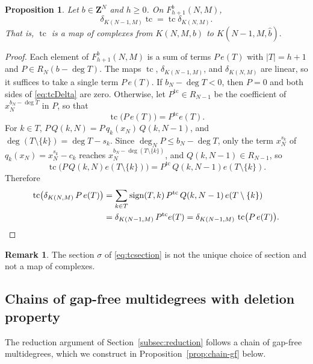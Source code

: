 \documentclass[12pt]{amsart}
\newtheorem{proposition}[theorem]{Proposition}
\theoremstyle{definition}
\newtheorem{remark1}[theorem]{Remark}
\theoremstyle{remark}
\newcommand{\sgn}{\operatorname{sign}}
\newcommand{\tc}{\operatorname{tc}}
\def\what{\hat}
\newcommand{\Z}{\mathbf Z}
\begin{document}
\begin{proposition}\label{prop:tcchain}
Let $b\in\Z^N$ and $h \geq 0$.
On $F^b_{h+1}(N, M)$,
\begin{equation}\label{eq:tcDelta}
 \delta_{K(N-1,M)} \tc = \tc \delta_{K(N, M)}.
 \end{equation}
That is, $\tc$ is a map of complexes from $K(N, M, b)$ to $K(N-1, M, {\what b}).$
\end{proposition}
\begin{proof}
Each element of $F^b_{h+1}(N, M)$ is a sum of terms $P\,e(T)$ with $|T|=h+1$
and $P\in R_N(b-\deg T)$.
The maps $\tc$, $\delta_{K(N-1, M)}$, and $\delta_{K(N, M)}$ are linear,
so it suffices to take a single term $P\,e(T)$. 
If $b_N-\deg T<0$, then $P=0$ and both sides of \eqref{eq:tcDelta}
are zero.
Otherwise, let $P^{\tc}\in R_{N-1}$ be the coefficient of
$x_N^{b_N-\deg T}$ in $P$, so that
\[ \tc\bigl(P\,e(T)\bigr)=P^{\tc}e(T). \]
For $k\in T$, $P\,Q(k,N)=P\,q_k(x_N)\,Q(k,N-1)$, and
$\deg(T\setminus\{k\})=\deg T-s_k$.
Since $\deg_N P\le b_N-\deg T$, only the term $x_N^{s_k}$ of
$q_k(x_N) = x_N^{s_k} - c_k$ reaches $x_N^{b_N-\deg(T\setminus\{k\})}$,
and $Q(k, N-1) \in R_{N-1}$, so
\[
\tc \bigl( P\,Q(k,N) e(T\setminus\{k\})\bigr) =  P^{\tc}\,Q(k,N-1) e(T\setminus\{k\}).
\]
Therefore
\begin{align*}
\tc \bigl( \delta_{K(N,M)}\, P\,e(T)\bigr)
 &=\sum_{k\in T}\sgn(T,k)\,P^{\tc}\,Q(k,N-1)\,e(T\setminus\{k\})\\
 &=\delta_{K(N-1,M)}\, P^{\tc}e(T)
  =\delta_{K(N-1,M)}\,\tc\bigl(P\,e(T)\bigr).\qedhere
\end{align*}
\end{proof}
\begin{remark1}
The section $\sigma$ of \eqref{eq:tcsection} is not the unique choice of section
and not a map of complexes.
\end{remark1}


\subsection{Chains of gap-free multidegrees with deletion property}\label{subsec:chain}

The reduction argument of Section~\ref{subsec:reduction}
follows a chain of gap-free multidegrees, which we construct in
Proposition~\ref{prop:chain-gf} below.
\end{document}
